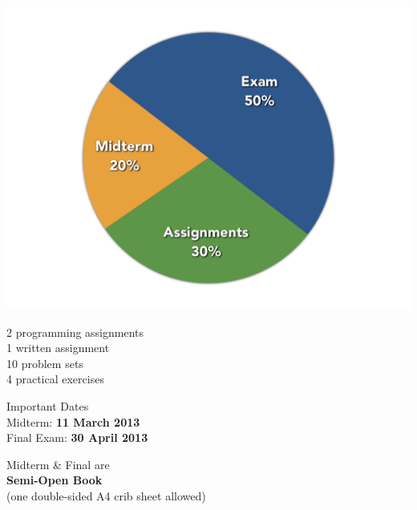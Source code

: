 \begin{frame}
\begin{center}
	\includegraphics[scale=0.3]{figures/assessment-chart.png}
\end{center}
\end{frame}

\begin{frame}
\begin{center}
\large
2 programming assignments\\
1 written assignment\\
10 problem sets\\
4 practical exercises\\
\end{center}
\end{frame}

\begin{frame}
\begin{center}
\large
Important Dates\\
Midterm: \textbf{11 March 2013}\\
Final Exam: \textbf{30 April 2013}
\end{center}
\end{frame}

\begin{frame}
\begin{center}
\large
Midterm \& Final are\\
\large
\textbf{Semi-Open Book}\\
\normalsize
(one double-sided A4 crib sheet allowed)
\end{center}
\end{frame}

